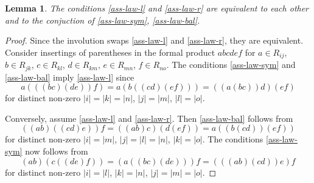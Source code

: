 \documentclass{article}
\newtheorem{lemma}{Lemma}
\theoremstyle{definition}
\begin{document}
\begin{lemma} \label{ass-cond}
    The conditions \ref{ass-law-l} and \ref{ass-law-r} are equivalent to each other and to the conjuction of \ref{ass-law-sym}, \ref{ass-law-bal}.
\end{lemma}
\begin{proof}
    Since the involution swaps \ref{ass-law-l} and \ref{ass-law-r}, they are equivalent. Consider insertings of parentheses in the formal product \(abcdef\) for \(a \in R_{ij}\), \(b \in R_{jk}\), \(c \in R_{kl}\), \(d \in R_{km}\), \(e \in R_{mn}\), \(f \in R_{no}\). The conditions \ref{ass-law-sym} and \ref{ass-law-bal} imply \ref{ass-law-l} since \[
        a(((bc)(de))f)
        =
        a(b((cd)(ef)))
        =
        ((a(bc))d)(ef)
    \] for distinct non-zero \(
        |i| = |k| = |n|
    \), \(
        |j| = |m|
    \), \(
        |l| = |o|
    \).

    Conversely, assume \ref{ass-law-l} and \ref{ass-law-r}. Then \ref{ass-law-bal} follows from \[
        ((ab)((cd)e))f
        =
        ((ab)c)(d(ef))
        =
        a((b(cd))(ef))
    \] for distinct non-zero \(
        |i| = |m|
    \), \(
        |j| = |l| = |n|
    \), \(
        |k| = |o|
    \). The conditions \ref{ass-law-sym} now follows from \[
        (ab)(c((de)f))
        =
        (a((bc)(de)))f
        =
        (((ab)(cd))e)f
    \] for distinct non-zero \(
        |i| = |l|
    \), \(
        |k| = |n|
    \), \(
        |j| = |m| = |o|
    \).
\end{proof}
\end{document}
